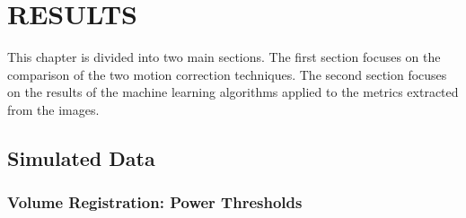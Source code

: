\chapter{RESULTS}
\label{ch:results}

This chapter is divided into two main sections. The first section focuses on the comparison of the two motion correction techniques. The second section focuses on the results of the machine learning algorithms applied to the metrics extracted from the images.


\section{Simulated Data}

\subsection{Volume Registration: Power Thresholds}

